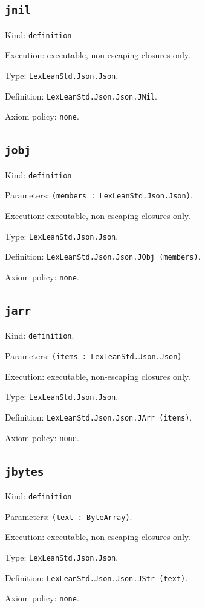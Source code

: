 \documentclass[11pt]{article}
\begin{document}
\subsection*{\texttt{jnil}}
\noindent Kind: \texttt{definition}.\par
\noindent Execution: executable, non-escaping closures only.\par
\noindent Type: \texttt{LexLeanStd.Json.Json}.\par
\noindent Definition: \texttt{LexLeanStd.Json.Json.JNil}.\par
\noindent Axiom policy: \texttt{none}.\par
\subsection*{\texttt{jobj}}
\noindent Kind: \texttt{definition}.\par
\noindent Parameters: \texttt{(members : LexLeanStd.Json.Json)}.\par
\noindent Execution: executable, non-escaping closures only.\par
\noindent Type: \texttt{LexLeanStd.Json.Json}.\par
\noindent Definition: \texttt{LexLeanStd.Json.Json.JObj (members)}.\par
\noindent Axiom policy: \texttt{none}.\par
\subsection*{\texttt{jarr}}
\noindent Kind: \texttt{definition}.\par
\noindent Parameters: \texttt{(items : LexLeanStd.Json.Json)}.\par
\noindent Execution: executable, non-escaping closures only.\par
\noindent Type: \texttt{LexLeanStd.Json.Json}.\par
\noindent Definition: \texttt{LexLeanStd.Json.Json.JArr (items)}.\par
\noindent Axiom policy: \texttt{none}.\par
\subsection*{\texttt{jbytes}}
\noindent Kind: \texttt{definition}.\par
\noindent Parameters: \texttt{(text : ByteArray)}.\par
\noindent Execution: executable, non-escaping closures only.\par
\noindent Type: \texttt{LexLeanStd.Json.Json}.\par
\noindent Definition: \texttt{LexLeanStd.Json.Json.JStr (text)}.\par
\noindent Axiom policy: \texttt{none}.\par
\end{document}
